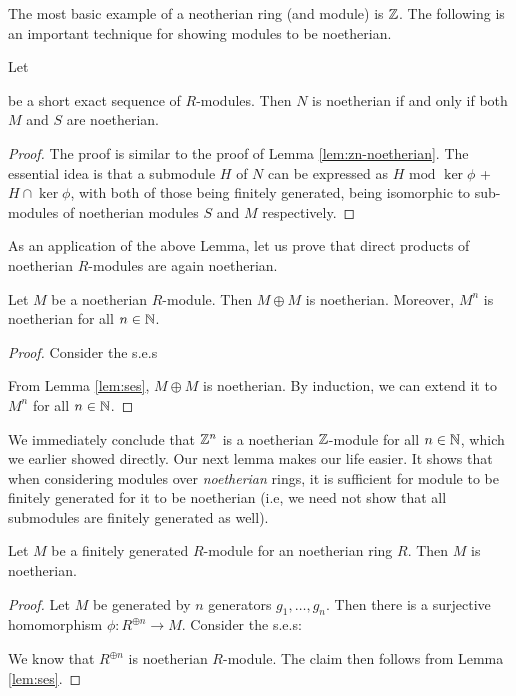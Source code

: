 \documentclass[11pt]{article}
\begin{document}
The most basic example of a neotherian ring (and module) is $\mathbb{Z}$. The following is an important technique for
showing modules to be noetherian.

\begin{lemma}\label{lem:ses}
Let
be a short exact sequence of $R$-modules. Then $N$ is noetherian if and only if both $M$  and $S$ are
noetherian.
\end{lemma}
\begin{proof}
The proof is similar to the proof of Lemma \ref{lem:zn-noetherian}. The essential idea is that a submodule
$H$ of $N$ can be expressed as $H \textrm{ mod } \ker{\phi}$ + $H\cap \ker{\phi}$, with both of those being
finitely generated, being isomorphic to sub-modules of noetherian modules $S$ and $M$ respectively.
\end{proof}

As an application of the above Lemma, let us prove that direct products of noetherian $R$-modules are again
noetherian.

\begin{lemma}\label{lem:direct-product-noetherian}
Let $M$ be a noetherian $R$-module. Then $M\oplus M$ is noetherian. Moreover, $M^n$ is noetherian for all
$n\in \mathbb{N}$.
\end{lemma}
\begin{proof}
Consider the s.e.s
From Lemma \ref{lem:ses}, $M\oplus M$ is noetherian. By induction, we can extend it to $M^n$ for all $n\in \mathbb{N}$.
\end{proof}
We immediately conclude that $\mathbb{Z}^n$ is a noetherian $\mathbb{Z}$-module for all $n\in \mathbb{N}$, which we earlier showed directly.
Our next lemma makes our life easier. It shows that when considering modules over {\em noetherian} rings, it is
sufficient for module to be finitely generated for it to be noetherian (i.e, we need not show that all submodules
are finitely generated as well).

\begin{lemma}\label{lem:modules-noetherian-ring}
Let $M$ be a finitely generated $R$-module for an noetherian ring $R$. Then $M$ is noetherian.
\end{lemma}
\begin{proof}
Let $M$ be generated by $n$ generators $g_1,\ldots, g_n$. Then there is a surjective homomorphism
$\phi: R^{\oplus n}\rightarrow M$. Consider the s.e.s:
We know that $R^{\oplus n}$ is noetherian $R$-module.
The claim then follows from Lemma \ref{lem:ses}.
\end{proof}
\end{document}
